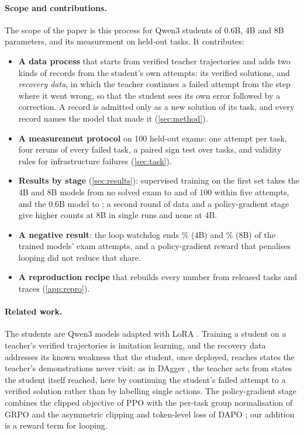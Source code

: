 \paragraph{Scope and contributions.} The scope of the paper is this process for Qwen3 students of 0.6B, 4B and 8B
parameters, and its measurement on held-out tasks. It contributes:
\begin{itemize}
\item \textbf{A data process} that starts from verified teacher trajectories and adds two kinds of records from the
  student's own attempts: its verified solutions, and \emph{recovery data}, in which the teacher continues a failed
  attempt from the step where it went wrong, so that the student sees its own error followed by a correction. A record
  is admitted only as a new solution of its task, and every record names the model that made it (\cref{sec:method}).
\item \textbf{A measurement protocol} on 100 held-out exams: one attempt per task, four reruns of every failed task, a
  paired sign test over tasks, and validity rules for infrastructure failures (\cref{sec:task}).
\item \textbf{Results by stage} (\cref{sec:results}): supervised training on the first set takes the 4B and 8B models
  from no solved exam to \examFourFullFive{} and \examEightFullFive{} of 100 within five attempts, and the 0.6B model
  to \examZeroFullFive{}; a second round of data and a policy-gradient stage give higher counts at 8B in single runs
  and none at 4B.
\item \textbf{A negative result}: the loop watchdog ends \behaviourFourFullExamLoopPct{}\% (4B) and
  \behaviourEightFullExamLoopPct{}\% (8B) of the trained models' exam attempts, and a policy-gradient reward that
  penalises looping did not reduce that share.
\item \textbf{A reproduction recipe} that rebuilds every number from released tasks and traces (\cref{app:repro}).
\end{itemize}

\paragraph{Related work.} The students are Qwen3 models \citep{qwen3} adapted with LoRA \citep{lora}. Training a
student on a teacher's verified trajectories is imitation learning, and the recovery data addresses its known weakness
that the student, once deployed, reaches states the teacher's demonstrations never visit: as in DAgger \citep{dagger},
the teacher acts from states the student itself reached, here by continuing the student's failed attempt to a verified
solution rather than by labelling single actions. The policy-gradient stage combines the clipped objective of PPO
\citep{ppo} with the per-task group normalisation of GRPO \citep{grpo} and the asymmetric clipping and token-level loss
of DAPO \citep{dapo}; our addition is a reward term for looping.
